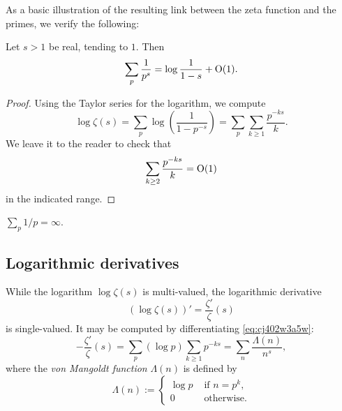 \documentclass[reqno]{amsart}  \numberwithin{theorem}{section} \numberwithin{equation}{section}
\begin{document}
As a basic illustration of the resulting link between the zeta function and the primes, we verify the following:
\begin{lemma}
  Let $s > 1$ be real, tending to $1$.  Then
  \begin{equation*}
\sum_p \frac{1}{ p^s } = \log \frac{1}{1 - s} + \operatorname{O}(1).
\end{equation*}
\end{lemma}
\begin{proof}
  Using the Taylor series for the logarithm, we compute
  \begin{equation}\label{eq:cj402w3a5w}
    \log \zeta (s) = \sum_p \log \left( \frac{1}{1 - p^{- s}} \right)
    =
    \sum_p \sum_{k \geq 1} \frac{p^{- k s }}{ k}.
  \end{equation}
  We leave it to the reader to check that
  \begin{equation}
\sum_{k \geq 2} \frac{p^{- k s}}{ k }  = \operatorname{O}(1)
  \end{equation}
  in the indicated range.
\end{proof}
\begin{corollary}
$\sum_p 1 / p = \infty$.
\end{corollary}

\subsection{Logarithmic derivatives}
While the logarithm $\log \zeta(s)$ is multi-valued, the logarithmic derivative
\begin{equation*}
  \left( \log \zeta(s) \right) '
  = \frac{\zeta '}{\zeta } (s) 
\end{equation*}
is single-valued.  It may be computed by differentiating \eqref{eq:cj402w3a5w}:
\begin{equation*}
- \frac{\zeta '}{ \zeta } (s) = \sum _p (\log p) \sum_{k \geq 1} p^{- k s} = \sum_n \frac{\Lambda(n) }{n^s},
\end{equation*}
where the \emph{von Mangoldt function} $\Lambda(n)$ is defined by
\begin{equation*}
\Lambda(n) :=
\begin{cases}
\log p & \text{ if } n = p ^k, \\
0 & \text{ otherwise.}
\end{cases}
\end{equation*}
\end{document}
